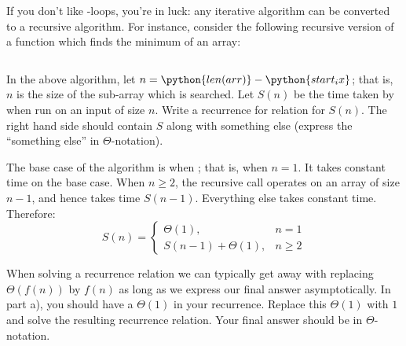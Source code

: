 \begin{prob}
    If you don't like -loops, you're in luck: any iterative algorithm
    can be converted to a recursive algorithm.
    For instance, consider the following recursive version of a function which
    finds the minimum of an array:
    \inputminted[firstline=1, lastline=16]{python}{\thisdir/include/recursive_selection_sort.py}

    \begin{subprobset}
        \begin{subprob}
            In the above algorithm, let $n = \python{len(arr)} -
            \python{start_ix}$; that is, $n$ is the size of the sub-array which is
            searched.  Let $S(n)$ be the time taken by  when run on
            an input of size $n$.  Write a recurrence for relation
            for $S(n)$. The right hand side should contain $S$ along with something
            else (express the ``something else'' in $\Theta$-notation).

            \begin{soln}
                The base case of the algorithm is when ;
                that is, when $n = 1$. It takes constant time on the base case.
                When $n \geq 2$,
                the recursive call operates on an array of size $n - 1$, and
                hence takes time $S(n-1)$. Everything else takes constant time.
                Therefore: 
                \[
                    S(n) = 
                    \begin{cases}
                        \Theta(1),& n = 1\\
                        S(n-1) + \Theta(1),& n \geq 2
                    \end{cases}
                \]
            \end{soln}
            
        \end{subprob}

        \begin{subprob}
            When solving a recurrence relation we can typically get away
            with replacing $\Theta(f(n))$ by $f(n)$ as long as we express our
            final answer asymptotically. In part a), you should have a $\Theta(1)$ in your recurrence. Replace
            this $\Theta(1)$ with $1$ and solve the resulting recurrence relation.
            Your final answer should be in $\Theta$-notation.


\end{subprob}
\end{subprobset}
\end{prob}
